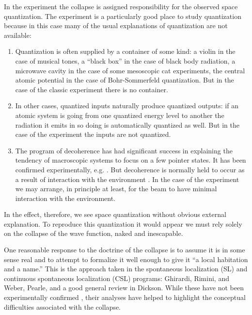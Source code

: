 \documentclass[aps,prl,superscriptaddress,12pt]{revtex4-2}
\begin{document}
In the \sg experiment
	\cite{Gerlach:1922a,Gerlach:1922b,Gerlach:1922c}
	the collapse is assigned responsibility for the observed space quantization. 
The \sg experiment is a particularly good place to study quantization 
	because in this case many of the usual explanations of quantization are not available: 
\begin{enumerate}
\item Quantization is often supplied by a container of some kind: 
		a violin in the case of musical tones,
		a ``black box'' in the case of black body radiation, 
		a microwave cavity in the case of some mesoscopic cat experiments, 
		the central atomic potential in the case of Bohr-Sommerfeld quantization.  
	But in the case of the classic \sg experiment there is no container.
\item In other cases, quantized inputs naturally produce quantized outputs:
	 if an atomic system is going from one quantized energy level to another 
		the radiation it emits in so doing is automatically quantized as well.  
	But in the case of the \sg experiment the inputs are not quantized.
\item The program of decoherence
\cite{Namiki:1997,Omnes:1994a,Omnes:1997,Zeh:1996a,Zeh:2003} 
	has had significant success in explaining the tendency of macroscopic systems 
		to focus on a few pointer states. 
	It has been confirmed experimentally, e.g.
\cite{Raimond:1997,Brune:1996}.
	But decoherence is normally held to occur as a result of interaction with the environment
		\cite{Joos:1996,Joos:1999,Tegmark:2000b,Myatt:2000}. 
	In the case of the \sg experiment we may arrange, 
		in principle at least, 
		for the beam to have minimal interaction with the environment. 
\end{enumerate}
In the \sg effect, therefore, we see space quantization without obvious external explanation. 
To reproduce this quantization it would appear 
	we must rely solely on the collapse of the wave function, 
	naked and inescapable. 

One reasonable response to the doctrine of the collapse is to assume it is in some sense real 
	and to attempt to formalize it well enough to give it ``a local habitation and a name.'' 
This is the approach taken in the spontaneous localization (SL) 
	and continuous spontaneous localization (CSL) programs: 
	Ghirardi, Rimini, and Weber\cite{Ghirardi:1986}, Pearle\cite{Pearle:1989,Pearle:1994}, 
	and a good general review in Dickson\cite{Dickson:1998}. 
While these have not been experimentally confirmed
	\cite{Ghose:1999,Auletta:2000}, 
	their analyses have helped to highlight the conceptual difficulties associated with the collapse.
\end{document}
